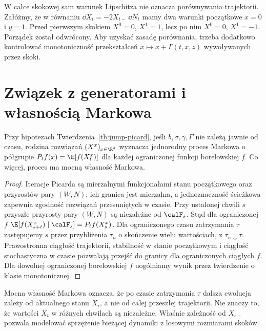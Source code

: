 \begin{przyklad}
W całce skokowej sam warunek Lipschitza nie oznacza
porównywania trajektorii. Załóżmy, że w równaniu
$\dd X_t=-2X_{t-}\,\dd N_t$ mamy dwa warunki
początkowe $x=0$ i $y=1$. Przed pierwszym skokiem
$X^0=0$, $X^1=1$, lecz po nim $X^0=0$, $X^1=-1$.
Porządek został odwrócony. Aby uzyskać zasadę porównania,
trzeba dodatkowo kontrolować monotoniczność przekształceń
$x\mapsto x+\Gamma(t,x,z)$ wywoływanych przez skoki.
\end{przyklad}

\section{Związek z generatorami i własnością Markowa}

\begin{stwierdzenie}
\label{prop:jump-markov}
Przy hipotezach Twierdzenia~\ref{th:jump-picard}, jeśli
$b,\sigma,\gamma,\Gamma$ nie zależą jawnie od czasu,
rodzina rozwiązań $(X^x)_{x\in\R^d}$ wyznacza
jednorodny proces Markowa o półgrupie
$P_tf(x)=\E[f(X_t^x)]$ dla każdej ograniczonej funkcji
borelowskiej $f$. Co więcej, proces ma mocną własność Markowa.
\end{stwierdzenie}
\begin{proof}
Iteracje Picarda są mierzalnymi funkcjonałami stanu
początkowego oraz przyrostów pary $(W,N)$; ich granica
jest mierzalna, a jednoznaczność ścieżkowa zapewnia
zgodność rozwiązań przesuniętych w czasie. Przy ustalonej
chwili $s$ przyszłe przyrosty pary $(W,N)$ są niezależne
od $\calF_s$. Stąd dla ograniczonej $f$
$\E[f(X_{s+t}^x)\mid\calF_s]=P_tf(X_s^x)$.
Dla ograniczonego czasu zatrzymania $\tau$ zastępujemy
$s$ przez przybliżenia $\tau_n$ o skończenie wielu
wartościach, z $\tau_n\downarrow\tau$. Prawostronna
ciągłość trajektorii, stabilność w stanie początkowym
i ciągłość stochastyczna w czasie pozwalają przejść
do granicy dla ograniczonych ciągłych $f$.
Dla dowolnej ograniczonej borelowskiej $f$ uogólniamy
wynik przez twierdzenie o klasie monotonicznej.
\end{proof}

\begin{uwaga}
Mocna własność Markowa oznacza, że po czasie zatrzymania
$\tau$ dalsza ewolucja zależy od aktualnego stanu
$X_\tau$, a nie od całej przeszłej trajektorii. Nie znaczy
to, że wartości $X_t$ w różnych chwilach są niezależne.
Właśnie zależność od $X_{s-}$ pozwala modelować
sprzężenie bieżącej dynamiki z losowymi rozmiarami skoków.
\end{uwaga}

